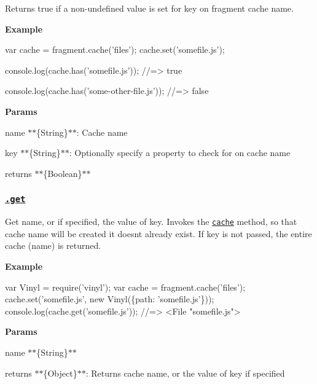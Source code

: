 Returns true if a non-\/undefined value is set for {\ttfamily key} on fragment cache {\ttfamily name}.

{\bfseries Example}


\begin{DoxyCode}
var cache = fragment.cache('files');
cache.set('somefile.js');

console.log(cache.has('somefile.js'));
//=> true

console.log(cache.has('some-other-file.js'));
//=> false
\end{DoxyCode}


{\bfseries Params}


\begin{DoxyItemize}
\item {\ttfamily name} $\ast$$\ast$\{String\}$\ast$$\ast$\+: Cache name
\item {\ttfamily key} $\ast$$\ast$\{String\}$\ast$$\ast$\+: Optionally specify a property to check for on cache {\ttfamily name}
\item {\ttfamily returns} $\ast$$\ast$\{Boolean\}$\ast$$\ast$
\end{DoxyItemize}

\subsubsection*{\href{index.js#L115}{\tt .get}}

Get {\ttfamily name}, or if specified, the value of {\ttfamily key}. Invokes the \href{#cache}{\tt cache} method, so that cache {\ttfamily name} will be created it doesn\textquotesingle{}t already exist. If {\ttfamily key} is not passed, the entire cache ({\ttfamily name}) is returned.

{\bfseries Example}


\begin{DoxyCode}
var Vinyl = require('vinyl');
var cache = fragment.cache('files');
cache.set('somefile.js', new Vinyl(\{path: 'somefile.js'\}));
console.log(cache.get('somefile.js'));
//=> <File "somefile.js">
\end{DoxyCode}


{\bfseries Params}


\begin{DoxyItemize}
\item {\ttfamily name} $\ast$$\ast$\{String\}$\ast$$\ast$
\item {\ttfamily returns} $\ast$$\ast$\{Object\}$\ast$$\ast$\+: Returns cache {\ttfamily name}, or the value of {\ttfamily key} if specified
\end{DoxyItemize}

